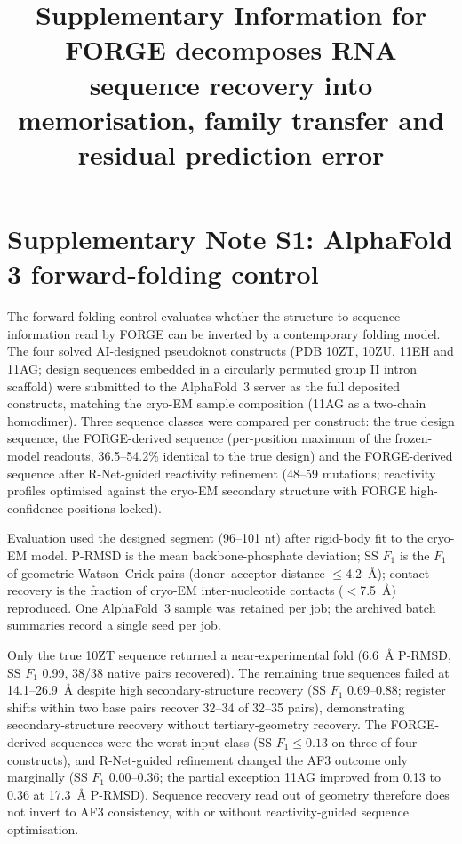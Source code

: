 \documentclass[pdflatex,sn-nature]{sn-jnl}
\begin{document}
\renewcommand{\arraystretch}{0.92}
\setlength{\tabcolsep}{4pt}

\setcounter{figure}{0}
\setcounter{table}{0}
\renewcommand{\thefigure}{S\arabic{figure}}
\renewcommand{\thetable}{S\arabic{table}}

\title{Supplementary Information for\\
FORGE decomposes RNA sequence recovery into memorisation, family transfer and
residual prediction error}

\date{}

\maketitle

\section*{Supplementary Note S1: AlphaFold 3 forward-folding control}

The forward-folding control evaluates whether the structure-to-sequence
information read by FORGE can be inverted by a contemporary folding model. The
four solved AI-designed pseudoknot constructs (PDB 10ZT, 10ZU, 11EH and 11AG;
design sequences embedded in a circularly permuted group II intron scaffold)
were submitted to the AlphaFold~3 server as the full deposited constructs,
matching the cryo-EM sample composition (11AG as a two-chain homodimer). Three
sequence classes were compared per construct: the true design sequence, the
FORGE-derived sequence (per-position maximum of the frozen-model readouts,
36.5--54.2\% identical to the true design) and the FORGE-derived sequence after
R-Net-guided reactivity refinement (48--59 mutations; reactivity profiles
optimised against the cryo-EM secondary structure with FORGE high-confidence
positions locked).

Evaluation used the designed segment (96--101 nt) after rigid-body fit to the
cryo-EM model. P-RMSD is the mean backbone-phosphate deviation; SS $F_1$ is the
$F_1$ of geometric Watson--Crick pairs (donor--acceptor distance
$\le$4.2~\AA); contact recovery is the fraction of cryo-EM inter-nucleotide
contacts ($<$7.5~\AA) reproduced. One AlphaFold~3 sample was retained per job; the archived batch summaries record a
single seed per job.

Only the true 10ZT sequence returned a near-experimental fold (6.6~\AA{}
P-RMSD, SS $F_1$ 0.99, 38/38 native pairs recovered). The remaining true
sequences failed at 14.1--26.9~\AA{} despite high secondary-structure recovery
(SS $F_1$ 0.69--0.88; register shifts within two base pairs recover 32--34 of
32--35 pairs), demonstrating secondary-structure recovery without
tertiary-geometry recovery. The FORGE-derived sequences were the worst input
class (SS $F_1 \le 0.13$ on three of four constructs), and R-Net-guided
refinement changed the AF3 outcome only marginally (SS $F_1$ 0.00--0.36; the
partial exception 11AG improved from 0.13 to 0.36 at 17.3~\AA{} P-RMSD).
Sequence recovery read out of geometry therefore does not invert to
AF3 consistency, with or without reactivity-guided sequence optimisation.
\end{document}
